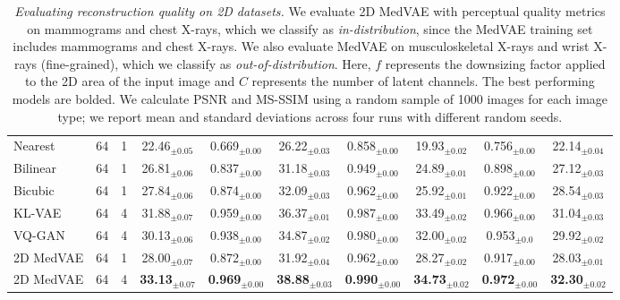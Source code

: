 \begin{table*}[t]
{\begin{tabular}{lccccccccc}
\small Nearest & 64 & 1   & 22.46$_{\pm0.05}$  & 0.669$_{\pm0.00}$ & 26.22$_{\pm0.03}$ & 0.858$_{\pm0.00}$ & 19.93$_{\pm0.02}$  & 0.756$_{\pm0.00}$  & 22.14$_{\pm0.04}$  \\
\small Bilinear & 64 & 1    & 26.81$_{\pm0.06}$  & 0.837$_{\pm0.00}$ & 31.18$_{\pm0.03}$ & 0.949$_{\pm0.00}$ & 24.89$_{\pm0.01}$  & 0.898$_{\pm0.00}$ & 27.12$_{\pm0.03}$  \\
\small Bicubic & 64 & 1    & 27.84$_{\pm0.06}$  & 0.874$_{\pm0.00}$ & 32.09$_{\pm0.03}$ & 0.962$_{\pm0.00}$  & 25.92$_{\pm0.01}$  & 0.922$_{\pm0.00}$  & 28.54$_{\pm0.03}$ \\
\small KL-VAE & 64 & 4    & 31.88$_{\pm0.07}$  & 0.959$_{\pm0.00}$ &36.37$_{\pm0.01}$ &0.987$_{\pm0.00}$ &33.49$_{\pm0.02}$ &0.966$_{\pm0.00}$ & 31.04$_{\pm0.03}$ \\
\small VQ-GAN & 64 & 4   & 30.13$_{\pm0.06}$  & 0.938$_{\pm0.00}$ & 34.87$_{\pm0.02}$ & 0.980$_{\pm0.00}$ & 32.00$_{\pm0.02}$  & 0.953$_{\pm0.0}$  & 29.92$_{\pm0.02}$ \\
\small 2D MedVAE  & 64 & 1   & 28.00$_{\pm0.07}$ & 0.872$_{\pm0.00}$ & 31.92$_{\pm0.04}$ &  0.962$_{\pm0.00}$ & 28.27$_{\pm0.02}$&  0.917$_{\pm0.00}$  & 28.03$_{\pm0.01}$\\
\small 2D MedVAE  & 64 & 4  & \textbf{33.13}$_{\pm0.07}$  & \textbf{0.969}$_{\pm0.00}$ & \textbf{38.88}$_{\pm0.03}$ &  \textbf{0.990}$_{\pm0.00}$ & \textbf{34.73}$_{\pm0.02}$&  \textbf{0.972}$_{\pm0.00}$& \textbf{32.30}$_{\pm0.02}$\\
\bottomrule
\end{tabular}
}
\caption{\textit{Evaluating reconstruction quality on 2D datasets.} We evaluate 2D MedVAE with perceptual quality metrics on mammograms and chest X-rays, which we classify as \textit{in-distribution}, since the MedVAE training set includes mammograms and chest X-rays. We also evaluate MedVAE on musculoskeletal X-rays and wrist X-rays (fine-grained), which we classify as \textit{out-of-distribution}. Here, $f$ represents the downsizing factor applied to the 2D area of the input image and $C$ represents the number of latent channels. The best performing models are bolded. We calculate PSNR and MS-SSIM using a random sample of 1000 images for each image type; we report mean and standard deviations across four runs with different random seeds.}
\label{table:perceptualid}
\end{table*}




